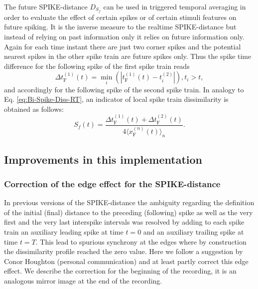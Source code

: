 \documentclass[10pt,twocolumn]{elsart5p}
\begin{document}
\begin{appendix}
The future SPIKE-distance $D_{S_f}$ can be used in triggered temporal averaging in order to evaluate the effect of certain spikes or of certain stimuli features on future spiking. It is the inverse measure to the realtime SPIKE-distance but instead of relying on past information only it relies on future information only. Again for each time instant there are just two corner spikes and the potential nearest spikes in the other spike train are future spikes only. Thus the spike time difference for the following spike of the first spike train reads
%
\begin{equation} \label{eq:Delta-Corner-Spike-Future}
     \Delta t_{\mathrm {F}}^{(1)} (t) = \min_i (| t_{\mathrm {F}}^{(1)} (t) - t_i^{(2)} |), t_i > t,
\end{equation}
%
and accordingly for the following spike of the second spike train. In analogy to Eq. \ref{eq:Bi-Spike-Diss-RT}, an indicator of local spike train dissimilarity is obtained as follows:
%
\begin{equation} \label{eq:Bi-Spike-Diss-FT}
    S_f (t) = \frac{ \Delta t_{\mathrm {F}}^{(1)} (t) + \Delta t_{\mathrm {F}}^{(2)} (t)} {4 \langle x_{\mathrm {F}}^{(n)} (t) \rangle_n}.
\end{equation}	




\subsection{\label{App-ss:Improvements} Improvements in this implementation}

\subsubsection{\label{App-sss:Edge-effect} Correction of the edge effect for the SPIKE-distance}

In previous versions of the SPIKE-distance the ambiguity regarding the definition of the initial (final) distance to the preceding (following) spike as well as the very first and the very last interspike intervals was resolved by adding to each spike train an auxiliary leading spike at time $t = 0$ and an auxiliary trailing spike at time $t = T$. This lead to spurious synchrony at the edges where by construction the dissimilarity profile reached the zero value. Here we follow a suggestion by Conor Houghton (personal communication) and at least partly correct this edge effect. We describe the correction for the beginning of the recording, it is an analogous mirror image at the end of the recording.


\end{appendix}
\end{document}

